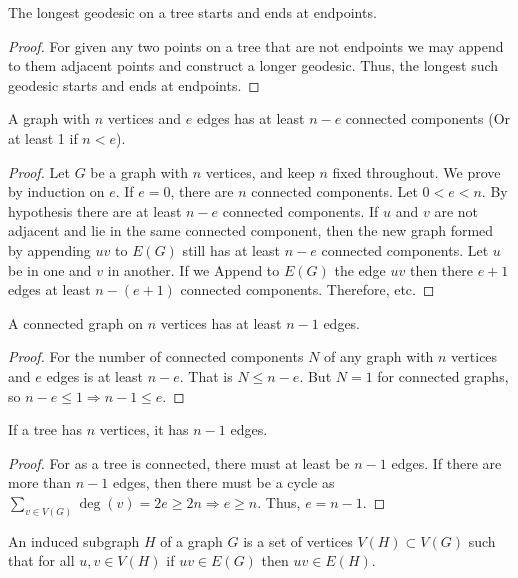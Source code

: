         \begin{theorem}
        The longest geodesic on a tree starts and ends at endpoints.
        \end{theorem}
        \begin{proof}
        For given any two points on a tree that are not endpoints we may append to them adjacent points and construct a longer geodesic. Thus, the longest such geodesic starts and ends at endpoints.
        \end{proof}
        \begin{theorem}
        A graph with $n$ vertices and $e$ edges has at least $n-e$ connected components (Or at least 1 if $n<e$).
        \end{theorem}
        \begin{proof}
        Let $G$ be a graph with $n$ vertices, and keep $n$ fixed throughout. We prove by induction on $e$. If $e=0$, there are $n$ connected components. Let $0<e < n$. By hypothesis there are at least $n-e$ connected components. If $u$ and $v$ are not adjacent and lie in the same connected component, then the new graph formed by appending $uv$ to $E(G)$ still has at least $n-e$ connected components. Let $u$ be in one and $v$ in another. If we Append to $E(G)$ the edge $uv$ then there $e+1$ edges at least $n-(e+1)$ connected components. Therefore, etc.
        \end{proof}
        \begin{theorem}
        A connected graph on $n$ vertices has at least $n-1$ edges.
        \end{theorem}
        \begin{proof}
        For the number of connected components $N$ of any graph with $n$ vertices and $e$ edges is at least $n-e$. That is $N\leq n-e$. But $N=1$ for connected graphs, so $n-e\leq 1 \Rightarrow n-1\leq e$.
        \end{proof}
        \begin{theorem}
        If a tree has $n$ vertices, it has $n-1$ edges.
        \end{theorem}
        \begin{proof} For as a tree is connected, there must at least be $n-1$ edges. If there are more than $n-1$ edges, then there must be a cycle as $\sum_{v\in V(G)} \deg(v) = 2e \geq 2n\Rightarrow e\geq n$. Thus, $e=n-1$. 
        \end{proof}
        \begin{definition}
        An induced subgraph $H$ of a graph $G$ is a set of vertices $V(H) \subset V(G)$ such that for all $u,v\in V(H)$ if $uv\in E(G)$ then $uv \in E(H)$.
        \end{definition}

